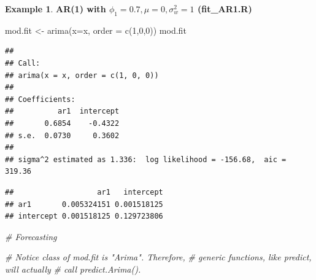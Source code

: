 \documentclass[
]{book}
\newenvironment{Shaded}{\begin{snugshade}}{\end{snugshade}}
\newcommand{\AttributeTok}[1]{\textcolor[rgb]{0.77,0.63,0.00}{#1}}
\newcommand{\CommentTok}[1]{\textcolor[rgb]{0.56,0.35,0.01}{\textit{#1}}}
\newcommand{\ConstantTok}[1]{\textcolor[rgb]{0.00,0.00,0.00}{#1}}
\newcommand{\DecValTok}[1]{\textcolor[rgb]{0.00,0.00,0.81}{#1}}
\newcommand{\FunctionTok}[1]{\textcolor[rgb]{0.00,0.00,0.00}{#1}}
\newcommand{\NormalTok}[1]{#1}
\newcommand{\OtherTok}[1]{\textcolor[rgb]{0.56,0.35,0.01}{#1}}
\newcommand{\SpecialCharTok}[1]{\textcolor[rgb]{0.00,0.00,0.00}{#1}}
\newcommand{\StringTok}[1]{\textcolor[rgb]{0.31,0.60,0.02}{#1}}
\theoremstyle{definition}
\theoremstyle{definition}
\newtheorem{example}{Example}[chapter]
\theoremstyle{definition}
\theoremstyle{definition}
\theoremstyle{remark}
\begin{document}
\begin{example}
\textbf{AR(1) with \(\phi_1=0.7, \mu=0, \sigma_w^2=1\) (fit\_AR1.R)}

\begin{Shaded}
\end{Shaded}

\begin{Shaded}
\begin{Highlighting}[]
\NormalTok{mod.fit }\OtherTok{\textless{}{-}} \FunctionTok{arima}\NormalTok{(}\AttributeTok{x=}\NormalTok{x, }\AttributeTok{order =} \FunctionTok{c}\NormalTok{(}\DecValTok{1}\NormalTok{,}\DecValTok{0}\NormalTok{,}\DecValTok{0}\NormalTok{))}
\NormalTok{mod.fit}
\end{Highlighting}
\end{Shaded}

\begin{verbatim}
## 
## Call:
## arima(x = x, order = c(1, 0, 0))
## 
## Coefficients:
##          ar1  intercept
##       0.6854    -0.4322
## s.e.  0.0730     0.3602
## 
## sigma^2 estimated as 1.336:  log likelihood = -156.68,  aic = 319.36
\end{verbatim}

\begin{Shaded}
\end{Shaded}

\begin{verbatim}
##                   ar1   intercept
## ar1       0.005324151 0.001518125
## intercept 0.001518125 0.129723806
\end{verbatim}

\begin{Shaded}
\begin{Highlighting}[]
\CommentTok{\# Forecasting}

\CommentTok{\# Notice class of mod.fit is "Arima". Therefore, }
\CommentTok{\#  generic functions, like predict, will actually}
\CommentTok{\#  call predict.Arima().}


\end{Highlighting}
\end{Shaded}
\end{example}
\end{document}
